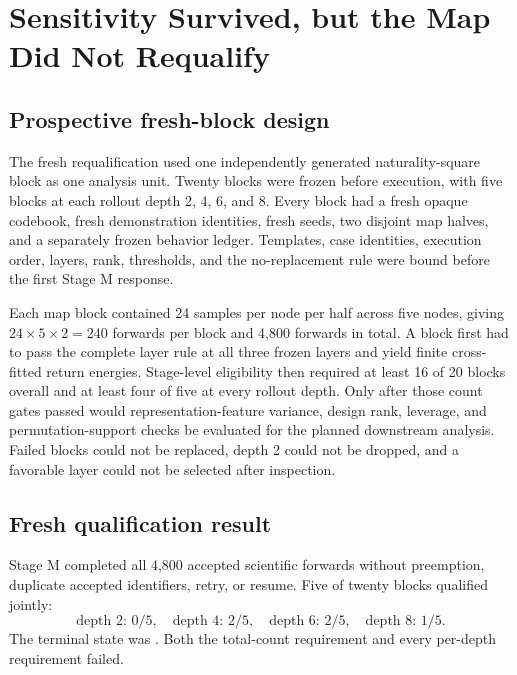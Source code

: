 \documentclass[10pt,a4paper]{article}
\newcommand{\code}[1]{\texttt{\detokenize{#1}}}
\begin{document}
\section{Sensitivity Survived, but the Map Did Not Requalify}
\label{sec:fresh}

\subsection{Prospective fresh-block design}

The fresh requalification used one independently generated naturality-square block as one analysis unit. Twenty blocks were frozen before execution, with five blocks at each rollout depth 2, 4, 6, and 8. Every block had a fresh opaque codebook, fresh demonstration identities, fresh seeds, two disjoint map halves, and a separately frozen behavior ledger. Templates, case identities, execution order, layers, rank, thresholds, and the no-replacement rule were bound before the first Stage M response.

Each map block contained 24 samples per node per half across five nodes, giving $24\times5\times2=240$ forwards per block and 4,800 forwards in total. A block first had to pass the complete layer rule at all three frozen layers and yield finite cross-fitted return energies. Stage-level eligibility then required at least 16 of 20 blocks overall and at least four of five at every rollout depth. Only after those count gates passed would representation-feature variance, design rank, leverage, and permutation-support checks be evaluated for the planned downstream analysis. Failed blocks could not be replaced, depth 2 could not be dropped, and a favorable layer could not be selected after inspection.

\subsection{Fresh qualification result}

Stage M completed all 4,800 accepted scientific forwards without preemption, duplicate accepted identifiers, retry, or resume. Five of twenty blocks qualified jointly:
\begin{equation}
  \text{depth 2: }0/5,\quad
  \text{depth 4: }2/5,\quad
  \text{depth 6: }2/5,\quad
  \text{depth 8: }1/5.
\end{equation}
The terminal state was \code{MAP_COMPLETE_NOT_QUALIFIED}. Both the total-count requirement and every per-depth requirement failed.
\end{document}
